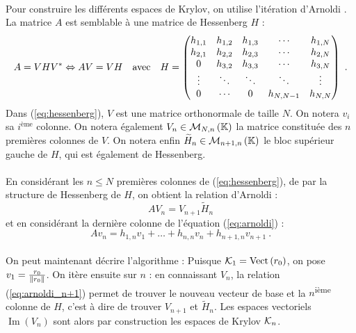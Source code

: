 		\paragraph{}
		Pour construire les différents espaces de Krylov, on utilise l'itération d'Arnoldi \cite{TrefethenBau1997}.
		La matrice $A$ est semblable à une matrice de Hessenberg $H$ :
		\begin{equation}\label{eq:hessenberg}
			A = VH{V}^*\Leftrightarrow AV = VH\quad\textrm{avec}\quad H=
			\begin{pmatrix}
				h_{1,1}&h_{1,2}&h_{1,3}&\cdots &h_{1,N}\\
				h_{2,1}&h_{2,2}&h_{2,3}&\cdots &h_{2,N}\\
				0      &h_{3,2}&h_{3,3}&\cdots &h_{3,N}\\
				\vdots &\ddots &\ddots &\ddots &\vdots \\
				0      &\cdots &0      &h_{N,N-1}&h_{N,N}
			\end{pmatrix}\ .
		\end{equation}
		Dans (\ref{eq:hessenberg}), $V$ est une matrice orthonormale de taille $N$.
		On notera $v_i$ sa $i^{\textrm{ème}}$ colonne.
		On notera également $V_n\in\mathcal{M}_{N, n}\left(\mathbb{K}\right)$ la matrice constituée des $n$ premières colonnes de $V$.
		On notera enfin $\widetilde{H}_n\in\mathcal{M}_{n+1, n}\left(\mathbb{K}\right)$ le bloc supérieur gauche de $H$, qui est également de Hessenberg.

		\paragraph{}
		En considérant les $n \le N$ premières colonnes de (\ref{eq:hessenberg}), de par la structure de Hessenberg de $H$, on obtient la relation d'Arnoldi :
		\begin{equation}\label{eq:arnoldi}
			AV_n = V_{n+1}\widetilde{H}_n
		\end{equation}
		et en considérant la dernière colonne de l'équation (\ref{eq:arnoldi}) :
		\begin{equation}\label{eq:arnoldi_n+1}
			Av_n = h_{1,n}v_1 + \dots + h_{n,n}v_n + h_{n+1,n}v_{n+1}\ .
		\end{equation}

		\paragraph{}
		On peut maintenant décrire l'algorithme :
		Puisque $\krylov{1} = \operatorname{Vect}\left(r_0\right)$, on pose $v_1 = \frac{r_0}{\norm{r_0}}$.
		On itère ensuite sur $n$ : en connaissant $V_n$, la relation (\ref{eq:arnoldi_n+1}) permet de trouver le nouveau vecteur de base et la $n$\textsuperscript{ième} colonne de $H$, c'est à dire de trouver $V_{n+1}$ et $\widetilde{H}_n$.
		Les espaces vectoriels $\operatorname{Im}\left(V_n\right)$ sont alors par construction les espaces de Krylov $\krylov{n}$.

